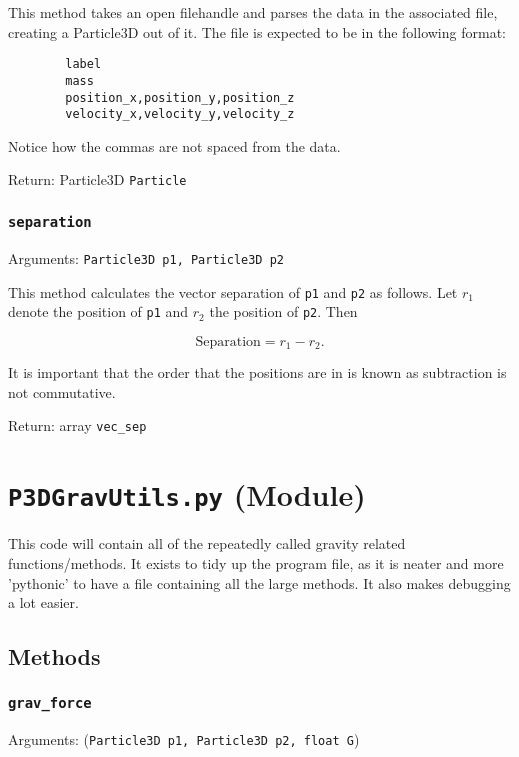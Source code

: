 \documentclass[a4paper, 11pt, british, left=1in, right=1in, top=0.3in, bottom=1in]{article}
\begin{document}
	This method takes an open filehandle and parses the data in the associated file, creating a Particle3D out of it. The file is expected to be in the following format:
	
	\begin{verbatim}
		label
		mass
		position_x,position_y,position_z
		velocity_x,velocity_y,velocity_z
	\end{verbatim}
	
	Notice how the commas are not spaced from the data.
	
	Return: Particle3D \texttt{Particle}
	
	\subsubsection{\texttt{separation}}
	
	Arguments: \texttt{Particle3D p1, Particle3D p2}
	
	This method calculates the vector separation of \texttt{p1} and \texttt{p2} as follows. Let $r_1$ denote the position of \texttt{p1} and $r_2$ the position of \texttt{p2}. Then
	
	$$\text{Separation} = r_1 - r_2.$$
	
	It is important that the order that the positions are in is known as subtraction is not commutative. 
	
	Return: array \texttt{vec\_sep}	
	
	\pagebreak
	
	\section{\texttt{P3DGravUtils.py} (Module)}
	
	This code will contain all of the repeatedly called gravity related functions/methods. It exists to tidy up the program file, as it is neater and more 'pythonic' to have a file containing all the large methods. It also makes debugging a lot easier. 
	
	\subsection{Methods}
	
	\subsubsection{\texttt{grav\_force}}
	
	Arguments: (\texttt{Particle3D p1, Particle3D p2, float G})
	
\end{document}
